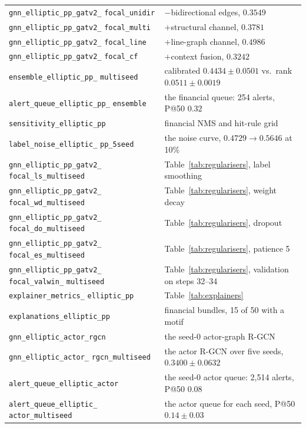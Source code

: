 \documentclass[conference]{IEEEtran}
\begin{document}
\begin{table}[tp]
\begin{tabular}{p{}p{}}
\texttt{gnn\_elliptic\_pp\_gatv2\_} \texttt{focal\_unidir} & $-$bidirectional edges, $0.3549$ \\
\texttt{gnn\_elliptic\_pp\_gatv2\_} \texttt{focal\_multi} & $+$structural channel, $0.3781$ \\
\texttt{gnn\_elliptic\_pp\_gatv2\_} \texttt{focal\_line} & $+$line-graph channel, $0.4986$ \\
\texttt{gnn\_elliptic\_pp\_gatv2\_} \texttt{focal\_cf} & $+$context fusion, $0.3242$ \\
\texttt{ensemble\_elliptic\_pp\_} \texttt{multiseed} & calibrated $0.4434 \pm 0.0501$ vs.\ rank $0.0511 \pm 0.0019$ \\
\texttt{alert\_queue\_elliptic\_pp\_} \texttt{ensemble} & the financial queue: 254 alerts, P@50 $0.32$ \\
\texttt{sensitivity\_elliptic\_pp} & financial NMS and hit-rule grid \\
\texttt{label\_noise\_elliptic\_} \texttt{pp\_5seed} & the noise curve, $0.4729 \rightarrow 0.5646$ at 10\% \\
\texttt{gnn\_elliptic\_pp\_gatv2\_} \texttt{focal\_ls\_multiseed} & Table~\ref{tab:regularisers}, label smoothing \\
\texttt{gnn\_elliptic\_pp\_gatv2\_} \texttt{focal\_wd\_multiseed} & Table~\ref{tab:regularisers}, weight decay \\
\texttt{gnn\_elliptic\_pp\_gatv2\_} \texttt{focal\_do\_multiseed} & Table~\ref{tab:regularisers}, dropout \\
\texttt{gnn\_elliptic\_pp\_gatv2\_} \texttt{focal\_es\_multiseed} & Table~\ref{tab:regularisers}, patience 5 \\
\texttt{gnn\_elliptic\_pp\_gatv2\_} \texttt{focal\_valwin\_} \texttt{multiseed} & Table~\ref{tab:regularisers}, validation on steps 32--34 \\
\texttt{explainer\_metrics\_} \texttt{elliptic\_pp} & Table~\ref{tab:explainers} \\
\texttt{explanations\_elliptic\_pp} & financial bundles, 15 of 50 with a motif \\
\texttt{gnn\_elliptic\_actor\_rgcn} & the seed-0 actor-graph R-GCN \\
\texttt{gnn\_elliptic\_actor\_} \texttt{rgcn\_multiseed} & the actor R-GCN over five seeds, $0.3400 \pm 0.0632$ \\
\texttt{alert\_queue\_elliptic\_actor} & the seed-0 actor queue: 2,514 alerts, P@50 $0.08$ \\
\texttt{alert\_queue\_elliptic\_} \texttt{actor\_multiseed} & the actor queue for each seed, P@50 $0.14 \pm 0.03$ \\

\end{tabular}
\end{table}
\end{document}
